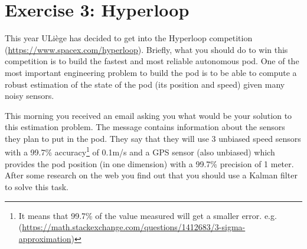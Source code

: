 \documentclass[9pt,a4paper]{extarticle}
\begin{document}
   \section*{Exercise 3: Hyperloop}
   This year ULiège has decided to get into the Hyperloop competition (\url{https://www.spacex.com/hyperloop}). Briefly, what you should do to win this competition is to build the fastest and most reliable autonomous pod. 
   One of the most important engineering problem to build the pod is to be able to compute a robust estimation of the state of the pod (its position and speed) given many noisy sensors. 
   
   This morning you received an email asking you what would be your solution to this estimation problem. The message contains information about the sensors they plan to put in the pod. They say that they will use 3 unbiased speed sensors with a 99.7\% accuracy\footnote{It means that 99.7\% of the value measured will get a smaller error. e.g. (\url{https://math.stackexchange.com/questions/1412683/3-sigma-approximation})} of 0.1m/s and a GPS sensor (also unbiased) which provides the pod  position (in one dimension) with a 99.7\% precision of 1 meter. After some research on the web you find out that you should use a Kalman filter to solve this task. 
   
\end{document}
